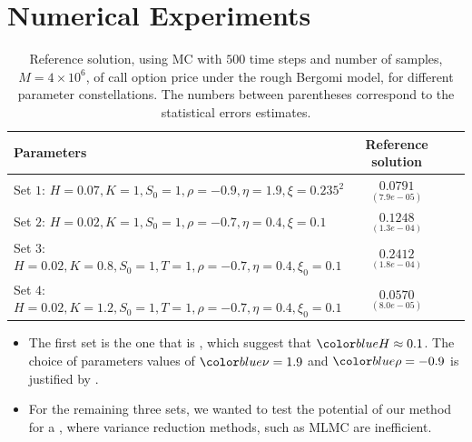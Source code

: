\documentclass[ima, 20pt, portrait, plainboxedsections]{sciposter}
\begin{document}
\begin{multicols}{3}
\begin{itemize}
	\end{itemize}

\section*{Numerical Experiments}
\begin{table}[!h]
\begin{small}
	\centering
\caption{Reference solution, using MC with $500$ time steps and number of samples, $M=4 \times 10^6$, of call option price under the rough Bergomi model, for different parameter constellations.  The numbers between parentheses correspond to the statistical errors estimates.}
\label{table:Reference solution, using MC with $500$ time steps, of Call option price under rBergomi model, for different parameter constellation.}
	\begin{tabular}{l*{2}{c}r}
	\toprule[1.5pt]
		\textbf{Parameters}            & \textbf{Reference solution}    \\
	\hline
			Set $1$:	$H=0.07, K=1,S_0=1, \rho=-0.9, \eta=1.9,\xi=0.235^2$   & $\underset{(7.9e-05)}{0.0791}$  \\	

				Set $2$:	$H=0.02, K=1, S_0=1, \rho=-0.7, \eta=0.4,\xi=0.1$   & $\underset{(1.3e-04)}{0.1248}$  \\
					Set $3$:	$H=0.02, K=0.8,S_0=1,T=1, \rho=-0.7, \eta=0.4,\xi_0=0.1$   & $\underset{(1.8e-04)}{0.2412}$  \\
				Set $4$:	$H=0.02, K=1.2,S_0=1,T=1, \rho=-0.7, \eta=0.4,\xi_0=0.1$   & $\underset{(8.0e-05)}{0.0570}$  \\
	\bottomrule[1.25pt]
	\end{tabular}
	\end{small}
\end{table}

\begin{itemize}
\item The first set is the one that is  \cite{gatheral2018volatility,bennedsen2016decoupling}, which suggest that $\blue{H} \approx 0.1$. The choice of parameters values of $\blue{\nu}= 1.9$ and $\blue{\rho}=-0.9$ is justified by \cite{bayer2016pricing}.

\item  For the remaining three sets, we wanted to test the potential of our method for a , where variance reduction methods, such as MLMC are inefficient.
\end{itemize}

\end{multicols}
\end{document}
